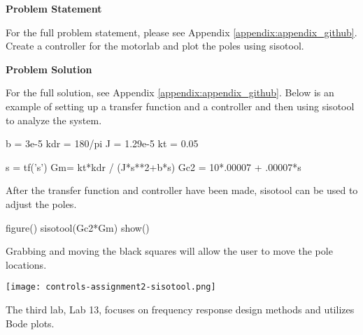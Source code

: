 \begin{tcolorbox}[breakable, enhanced jigsaw, title=ME 570: Assignment \ref{control_assignment_2}, 
    colframe=ksu-purple, colback=ksu-gray]

    \textbf{Problem Statement}
    \parindent15pt

    For the full problem statement, please see Appendix \ref{appendix:appendix_github}. Create a
    controller for the motorlab and plot the poles using sisotool.
    
    \tcblower
    \textbf{Problem Solution}
    \parindent15pt

    For the full solution, see Appendix \ref{appendix:appendix_github}. Below is an example of 
    setting up a transfer function and a controller and then using sisotool to analyze the system.

\begin{python}
b = 3e-5
kdr = 180/pi
J = 1.29e-5
kt = 0.05

s = tf('s')
Gm= kt*kdr / (J*s**2+b*s)
Gc2 = 10*.00007 + .00007*s
\end{python}

After the transfer function and controller have been made, sisotool can be used to adjust the poles.

\begin{python}
figure()
sisotool(Gc2*Gm)
show()
\end{python}

Grabbing and moving the black squares will allow the user to move the pole locations.

\begin{center}
    \texttt{[image: controls-assignment2-sisotool.png]}
\end{center}
\end{tcolorbox}

The third lab, Lab 13, focuses on frequency response design methods and utilizes Bode plots.

\label{control_assignment_3}

